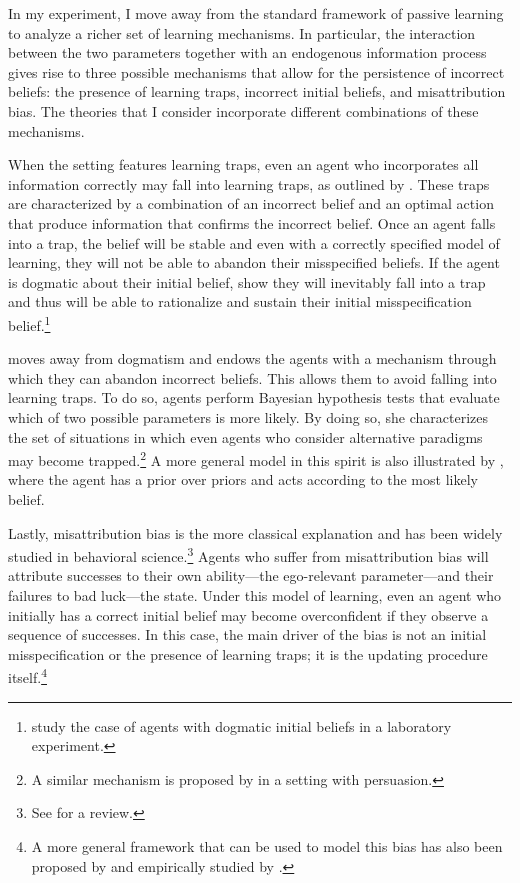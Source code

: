 \documentclass[
  12pt,
]{article}
\begin{document}
In my experiment, I move away from the standard framework of passive
learning to analyze a richer set of learning mechanisms. In particular,
the interaction between the two parameters together with an endogenous
information process gives rise to three possible mechanisms that allow
for the persistence of incorrect beliefs: the presence of learning
traps, incorrect initial beliefs, and misattribution bias. The theories
that I consider incorporate different combinations of these mechanisms.

When the setting features learning traps, even an agent who incorporates
all information correctly may fall into learning traps, as outlined by
\citet{Hestermann2021}. These traps are characterized by a combination
of an incorrect belief and an optimal action that produce information
that confirms the incorrect belief. Once an agent falls into a trap, the
belief will be stable and even with a correctly specified model of
learning, they will not be able to abandon their misspecified beliefs.
If the agent is dogmatic about their initial belief,
\citet{Heidhues2018} show they will inevitably fall into a trap and thus
will be able to rationalize and sustain their initial misspecification
belief.\footnote{\citet{Gotte2022} study the case of agents with dogmatic initial beliefs in a 
laboratory experiment.}

\citet{Ba2023} moves away from dogmatism and endows the agents with a
mechanism through which they can abandon incorrect beliefs. This allows
them to avoid falling into learning traps. To do so, agents perform
Bayesian hypothesis tests that evaluate which of two possible parameters
is more likely. By doing so, she characterizes the set of situations in
which even agents who consider alternative paradigms may become
trapped.\footnote{A similar mechanism is proposed by \citet{Schwarstein2021} in a setting with persuasion.}
A more general model in this spirit is also illustrated by
\citet{Ortoleva2012}, where the agent has a prior over priors and acts
according to the most likely belief.

Lastly, misattribution bias is the more classical explanation and has
been widely studied in behavioral
science.\footnote{See \citet{kelley1980} for a review.} Agents who
suffer from misattribution bias will attribute successes to their own
ability---the ego-relevant parameter---and their failures to bad
luck---the state. Under this model of learning, even an agent who
initially has a correct initial belief may become overconfident if they
observe a sequence of successes. In this case, the main driver of the
bias is not an initial misspecification or the presence of learning
traps; it is the updating procedure
itself.\footnote{A more general framework that can be used to model this bias has also been proposed by \citet{Brunnermeier2005} and empirically studied by \citet{Bracha2012}.}
\end{document}
